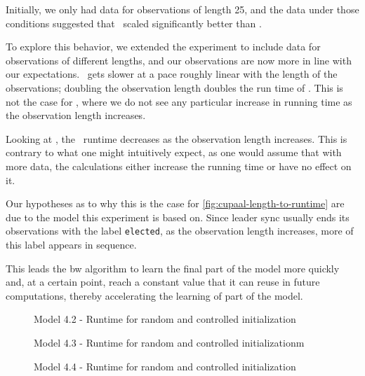 Initially, we only had data for observations of length 25, and the data under those conditions suggested that \Jajapy\ scaled significantly better than \Cupaal.

To explore this behavior, we extended the experiment to include data for observations of different lengths, and our observations are now more in line with our expectations.
\Jajapy\ gets slower at a pace roughly linear with the length of the observations; doubling the observation length doubles the run time of \Jajapy.
This is not the case for \Cupaal, where we do not see any particular increase in running time as the observation length increases.

Looking at , the \Cupaal\ runtime decreases as the observation length increases.
This is contrary to what one might intuitively expect, as one would assume that with more data, the calculations either increase the running time or have no effect on it.

Our hypotheses as to why this is the case for \autoref{fig:cupaal-length-to-runtime} are due to the model this experiment is based on.
Since leader sync usually ends its observations with the label \texttt{elected}, as the observation length increases, more of this label appears in sequence.

This leads the \gls{bw} algorithm to learn the final part of the model more quickly and, at a certain point, reach a constant value that it can reuse in future computations, thereby accelerating the learning of part of the model.


\begin{figure}
    
    \caption{Model 4.2 - Runtime for random and controlled initialization}
    \label{fig:semirandom-cupaal-jajapy-4-2}
\end{figure}

\begin{figure}
    
    \caption{Model 4.3 - Runtime for random and controlled initializationm}
    \label{fig:semirandom-cupaal-jajapy-4-3}
\end{figure}

\begin{figure}
    
    \caption{Model 4.4 - Runtime for random and controlled initialization}
    \label{fig:semirandom-cupaal-jajapy-4-4}
\end{figure}


